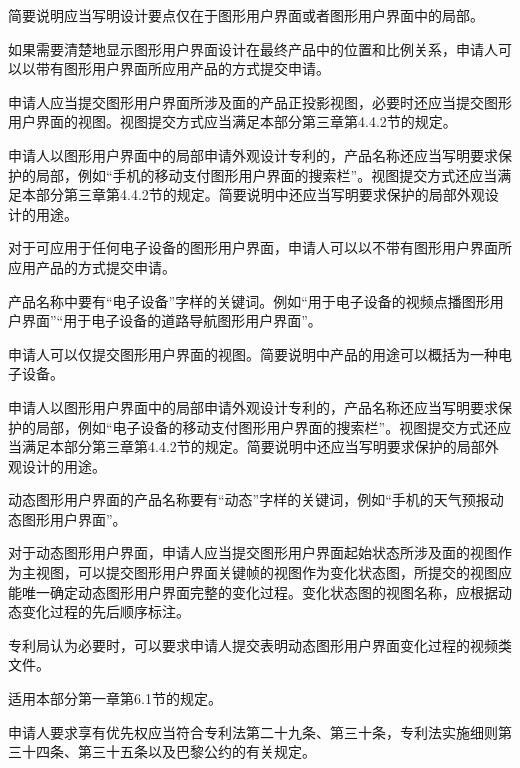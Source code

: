 简要说明应当写明设计要点仅在于图形用户界面或者图形用户界面中的局部。

如果需要清楚地显示图形用户界面设计在最终产品中的位置和比例关系，申请人可以以带有图形用户界面所应用产品的方式提交申请。

申请人应当提交图形用户界面所涉及面的产品正投影视图，必要时还应当提交图形用户界面的视图。视图提交方式应当满足本部分第三章第4.4.2节的规定。

申请人以图形用户界面中的局部申请外观设计专利的，产品名称还应当写明要求保护的局部，例如“手机的移动支付图形用户界面的搜索栏”。视图提交方式还应当满足本部分第三章第4.4.2节的规定。简要说明中还应当写明要求保护的局部外观设计的用途。

对于可应用于任何电子设备的图形用户界面，申请人可以以不带有图形用户界面所应用产品的方式提交申请。

产品名称中要有“电子设备”字样的关键词。例如“用于电子设备的视频点播图形用户界面”“用于电子设备的道路导航图形用户界面”。

申请人可以仅提交图形用户界面的视图。简要说明中产品的用途可以概括为一种电子设备。

申请人以图形用户界面中的局部申请外观设计专利的，产品名称还应当写明要求保护的局部，例如“电子设备的移动支付图形用户界面的搜索栏”。视图提交方式还应当满足本部分第三章第4.4.2节的规定。简要说明中还应当写明要求保护的局部外观设计的用途。

动态图形用户界面的产品名称要有“动态”字样的关键词，例如“手机的天气预报动态图形用户界面”。

对于动态图形用户界面，申请人应当提交图形用户界面起始状态所涉及面的视图作为主视图，可以提交图形用户界面关键帧的视图作为变化状态图，所提交的视图应能唯一确定动态图形用户界面完整的变化过程。变化状态图的视图名称，应根据动态变化过程的先后顺序标注。

专利局认为必要时，可以要求申请人提交表明动态图形用户界面变化过程的视频类文件。

适用本部分第一章第6.1节的规定。

申请人要求享有优先权应当符合专利法第二十九条、第三十条，专利法实施细则第三十四条、第三十五条以及巴黎公约的有关规定。

